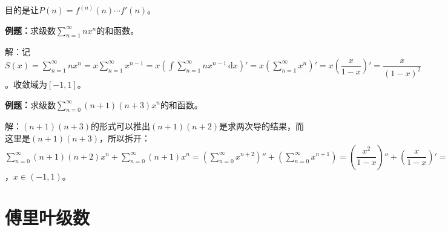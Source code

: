 目的是让$P(n)=f^{(n)}(n)\cdots f'(n)$。

\textbf{例题：}求级数$\sum\limits_{n=1}^\infty nx^n$的和函数。

解：记$S(x)=\sum\limits_{n=1}^\infty nx^n=x\sum\limits_{n=1}^\infty x^{n-1}=x(\int\sum\limits_{n=1}^\infty nx^{n-1}\,\textrm{d}x)'=x(\sum\limits_{n=1}^\infty x^n)'=x\left(\dfrac{x}{1-x}\right)'=\dfrac{x}{(1-x)^2}$。收敛域为$[-1,1]$。

\textbf{例题：}求级数$\sum\limits_{n=0}^\infty(n+1)(n+3)x^n$的和函数。

解：$(n+1)(n+3)$的形式可以推出$(n+1)(n+2)$是求两次导的结果，而这里是$(n+1)(n+3)$，所以拆开：$\sum\limits_{n=0}^\infty(n+1)(n+2)x^n+\sum\limits_{n=0}^\infty(n+1)x^n=\left(\sum\limits_{n=0}^\infty x^{n+2}\right)''+\left(\sum\limits_{n=0}^\infty x^{n+1}\right)=\left(\dfrac{x^2}{1-x}\right)''+\left(\dfrac{x}{1-x}\right)'=\dfrac{3-x}{(1-x)^3}$，$x\in(-1,1)$。

\section{傅里叶级数}

%
